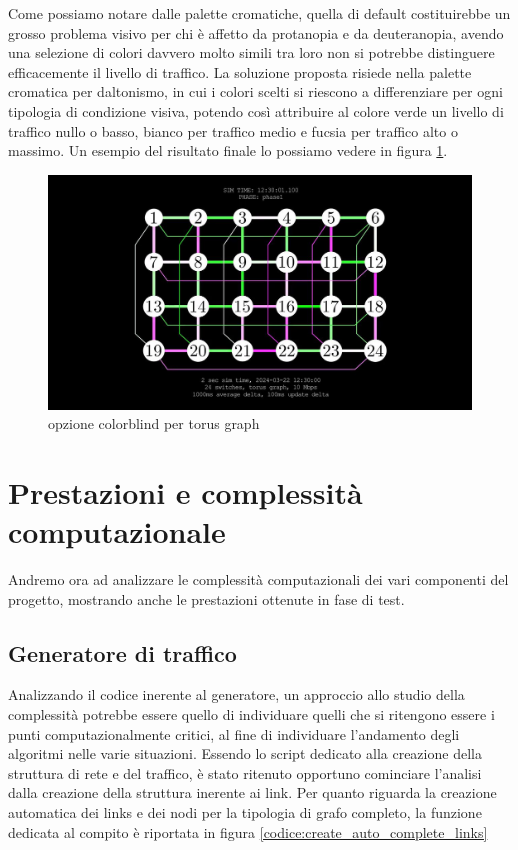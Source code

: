 \documentclass[binding=0.6cm]{sapthesis}
\begin{document}
Come possiamo notare dalle palette cromatiche, quella di default costituirebbe un grosso problema visivo per chi è affetto da protanopia e da deuteranopia, avendo
una selezione di colori davvero molto simili tra loro non si potrebbe distinguere efficacemente il livello di traffico. La soluzione proposta
risiede nella palette cromatica per daltonismo, in cui i colori scelti si riescono a differenziare per ogni tipologia di condizione visiva, potendo così
attribuire al colore verde un livello di traffico nullo o basso, bianco per traffico medio e fucsia per traffico alto o massimo. Un esempio
del risultato finale lo possiamo vedere in figura \ref{fig:colorblind_torus}.

\begin{figure}[h]
    \centering
    \includegraphics[width=1\textwidth]{immagini/colorblind_torus.JPG}
    \caption{opzione colorblind per torus graph}
    \label{fig:colorblind_torus}
\end{figure}

\chapter{Prestazioni e complessità computazionale}

Andremo ora ad analizzare le complessità computazionali dei vari componenti del progetto, mostrando anche le prestazioni ottenute in fase di test.

\section{Generatore di traffico}
Analizzando il codice inerente al generatore, un approccio allo studio della complessità potrebbe essere quello di individuare quelli che si ritengono essere
i punti computazionalmente critici, al fine di individuare l'andamento degli algoritmi nelle varie situazioni. Essendo lo script dedicato alla creazione della struttura di rete e del traffico,
è stato ritenuto opportuno cominciare l'analisi dalla creazione della struttura inerente ai link.
Per quanto riguarda la creazione automatica dei links e dei nodi
per la tipologia di grafo completo, la funzione dedicata al compito è riportata in figura \ref{codice:create_auto_complete_links}
\end{document}
